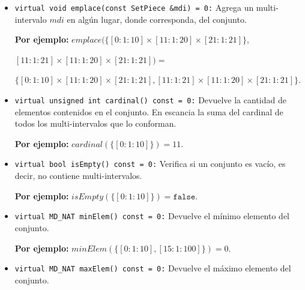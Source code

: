 \begin{itemize}
    \begin{center}
        \textbf{Por ejemplo:} $emplaceBack(\{[0: 1: 10] \times [11: 1: 20] \times [21: 1: 21]\}, [11: 1: 21] \times [11: 1: 20] \times [21: 1: 21])=\{[0: 1: 10] \times [11: 1: 20] \times [21: 1: 21], [11: 1: 21] \times [11: 1: 20] \times [21: 1: 21]\}$.
    \end{center}

     \item \texttt{virtual void emplace(const SetPiece \&mdi) = 0:}
     Agrega un multi-intervalo $mdi$ en algún lugar, donde corresponda, del conjunto.

     \begin{center}
        \textbf{Por ejemplo:} $emplace(\{[0: 1: 10] \times [11: 1: 20] \times [21: 1: 21]\},$
        
        $ [11: 1: 21] \times [11: 1: 20] \times [21: 1: 21])=$
        
        $\{[0: 1: 10] \times [11: 1: 20] \times [21: 1: 21], [11: 1: 21] \times [11: 1: 20] \times [21: 1: 21]\}$.
    \end{center}
    
    \item \texttt{virtual unsigned int cardinal() const = 0:}  
    Devuelve la cantidad de elementos contenidos en el conjunto. En escancia la suma del cardinal de todos los multi-intervalos que lo conforman.

     \begin{center}
        \textbf{Por ejemplo:} $cardinal(\{[0: 1: 10]\})=11$.
    \end{center}

    \item \texttt{virtual bool isEmpty() const = 0:}  
    Verifica si un conjunto es vacío, es decir, no contiene multi-intervalos.

         \begin{center}
        \textbf{Por ejemplo:} $isEmpty(\{[0: 1: 10]\})=\texttt{false}$.
    \end{center}

    \item \texttt{virtual MD\_NAT minElem() const = 0:}  
    Devuelve el mínimo elemento del conjunto.

    \begin{center}
        \textbf{Por ejemplo:} $minElem(\{[0: 1: 10], [15: 1: 100]\})=0$.
    \end{center}

    \item \texttt{virtual MD\_NAT maxElem() const = 0:}  
    Devuelve el máximo elemento del conjunto.


\end{itemize}
